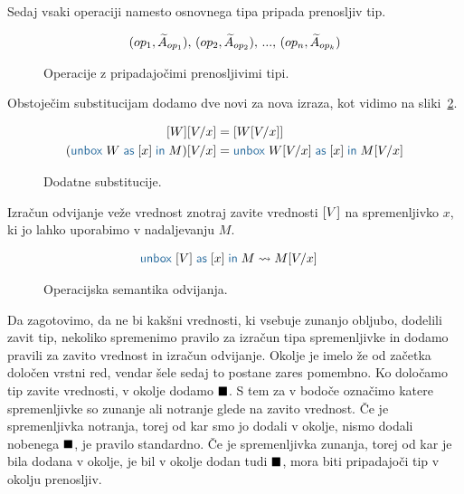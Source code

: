 Sedaj vsaki operaciji namesto osnovnega tipa pripada prenosljiv tip.

\begin{figure}[H]
	\centering
	\small
	\begin{align*}
	(op_1, \widetilde{A}_{op_1}),\, (op_2, \widetilde{A}_{op_2}),\, ... ,\, (op_n, \widetilde{A}_{op_k})
	\end{align*}
	\vspace{-5ex}
	\caption{Operacije z pripadajočimi prenosljivimi tipi.}
	\label{fig:prenosljive-operacije}
\end{figure}

Obstoječim substitucijam dodamo dve novi za nova izraza, kot vidimo na sliki~\ref{fig:substitucija-box}.

\begin{figure}[H]
	\centering
	\small
	\begin{align*}
		\tmboxed{W}[V/x] &= \tmboxed{W[V/x]} \\
		(\tmunbox{W}{x}{M})[V/x] &= \tmunbox{W[V/x]}{x}{M[V/x]}
	\end{align*}
	\vspace{-5ex}
	\caption{Dodatne substitucije.}
	\label{fig:substitucija-box}
\end{figure}

Izračun odvijanje veže vrednost znotraj zavite vrednosti $[V]$ na spremenljivko $x$, ki jo lahko uporabimo v nadaljevanju $M$.

\begin{figure}[h]
	\centering
	\small
	\begin{align*}
	\tmunbox{[V]}{x}{M} &\reduces M[V/x]
	\end{align*}
	
	\caption{Operacijska semantika odvijanja.}
	\label{fig:semantika-odvijanje}
\end{figure}

Da zagotovimo, da ne bi kakšni vrednosti, ki vsebuje zunanjo obljubo, dodelili zavit tip, nekoliko spremenimo pravilo za izračun tipa spremenljivke in dodamo pravili za zavito vrednost in izračun odvijanje.
Okolje je imelo že od začetka določen vrstni red, vendar šele sedaj to postane zares pomembno. Ko določamo tip zavite vrednosti, v okolje dodamo $\blacksquare$. S tem za v bodoče označimo katere spremenljivke so zunanje ali notranje glede na zavito vrednost. 
Če je spremenljivka notranja, torej od kar smo jo dodali v okolje, nismo dodali nobenega $\blacksquare$, je pravilo standardno. Če je spremenljivka zunanja, torej od kar je bila dodana v okolje, je bil v okolje dodan tudi $\blacksquare$, mora biti pripadajoči tip v okolju prenosljiv.


